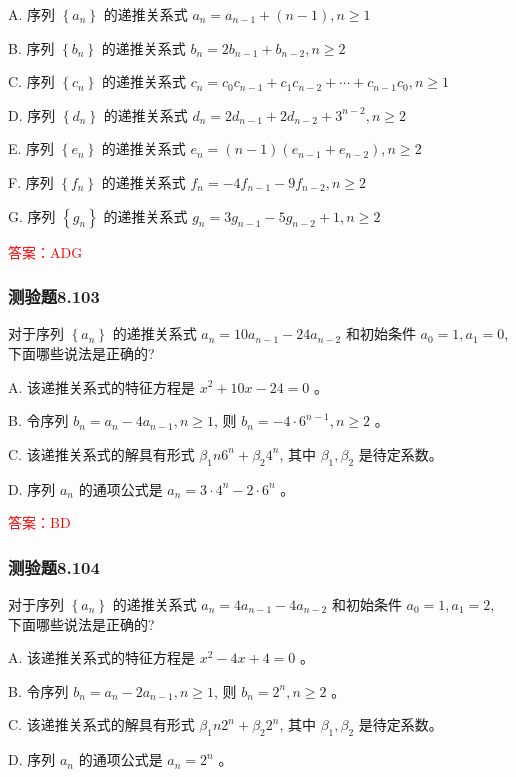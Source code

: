 \documentclass[UTF8, heading=true]{ctexart}
\begin{document}
A. 
序列 $\left\{a_n\right\}$ 的递推关系式 $a_n=a_{n-1}+(n-1), n \geq 1$

B. 
序列 $\left\{b_n\right\}$ 的递推关系式 $b_n=2 b_{n-1}+b_{n-2}, n \geq 2$

C. 
序列 $\left\{c_n\right\}$ 的递推关系式 $c_n=c_0 c_{n-1}+c_1 c_{n-2}+\cdots+c_{n-1} c_0, n \geq 1$

D. 
序列 $\left\{d_n\right\}$ 的递推关系式 $d_n=2 d_{n-1}+2 d_{n-2}+3^{n-2}, n \geq 2$

E. 
序列 $\left\{e_n\right\}$ 的递推关系式 $e_n=(n-1)\left(e_{n-1}+e_{n-2}\right), n \geq 2$

F.
序列 $\left\{f_n\right\}$ 的递推关系式 $f_n=-4 f_{n-1}-9 f_{n-2}, n \geq 2$

G.
序列 $\left\{g_n\right\}$ 的递推关系式 $g_n=3 g_{n-1}-5 g_{n-2}+1, n \geq 2$

\textcolor{red}{答案：ADG}

\subsubsection{测验题8.103}

对于序列 $\left\{a_n\right\}$ 的递推关系式 $a_n=10 a_{n-1}-24 a_{n-2}$ 和初始条件 $a_0=1, a_1=0$, 下面哪些说法是正确的?

A. 
该递推关系式的特征方程是 $x^2+10 x-24=0$ 。

B. 
令序列 $b_n=a_n-4 a_{n-1}, n \geq 1$, 则 $b_n=-4 \cdot 6^{n-1}, n \geq 2$ 。

C. 
该递推关系式的解具有形式 $\beta_1 n 6^n+\beta_2 4^n$, 其中 $\beta_1, \beta_2$ 是待定系数。

D. 
序列 $a_n$ 的通项公式是 $a_n=3 \cdot 4^n-2 \cdot 6^n$ 。

\textcolor{red}{答案：BD}

\subsubsection{测验题8.104}

对于序列 $\left\{a_n\right\}$ 的递推关系式 $a_n=4 a_{n-1}-4 a_{n-2}$ 和初始条件 $a_0=1, a_1=2$, 下面哪些说法是正确的?

A. 该递推关系式的特征方程是 $x^2-4 x+4=0$ 。

B. 令序列 $b_n=a_n-2 a_{n-1}, n \geq 1$, 则 $b_n=2^n, n \geq 2$ 。

C. 该递推关系式的解具有形式 $\beta_1 n 2^n+\beta_2 2^n$, 其中 $\beta_1, \beta_2$ 是待定系数。

D. 序列 $a_n$ 的通项公式是 $a_n=2^n$ 。
\end{document}

